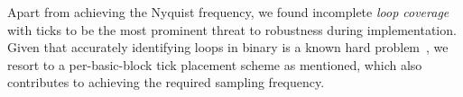 
Apart from achieving the Nyquist frequency, we found incomplete \emph{loop coverage} with ticks to be the most prominent threat to robustness during implementation.
Given that accurately identifying loops in binary is a known hard problem~\cite{e9patch}, we resort to a per-basic-block tick placement scheme as mentioned, which also contributes to achieving the required sampling frequency.






















